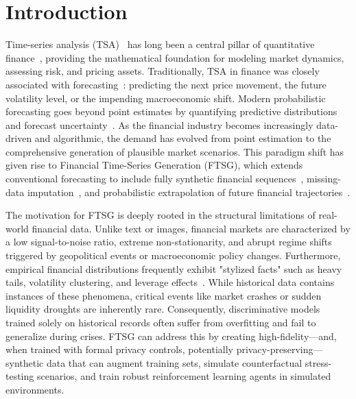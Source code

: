 \documentclass[11pt,a4paper]{article}
\begin{document}
\section{Introduction}
\label{sec:1}

Time-series analysis (TSA)~\citep{hamilton1994time,box2015time} has long been a central pillar of quantitative finance~\citep{campbell1997econometrics,tsay2010analysis}, providing the mathematical foundation for modeling market dynamics, assessing risk, and pricing assets. Traditionally, TSA in finance was closely associated with forecasting~\citep{hyndman2021forecasting}: predicting the next price movement, the future volatility level, or the impending macroeconomic shift. Modern probabilistic forecasting goes beyond point estimates by quantifying predictive distributions and forecast uncertainty~\citep{gneiting2014probabilistic}. As the financial industry becomes increasingly data-driven and algorithmic, the demand has evolved from point estimation to the comprehensive generation of plausible market scenarios. This paradigm shift has given rise to Financial Time-Series Generation (FTSG), which extends conventional forecasting to include fully synthetic financial sequences~\citep{Time-GAN,wiese2020,naritomi2020data}, missing-data imputation~\citep{yoon2018gain,tashiro2021csdi,wang2024cwgain}, and probabilistic extrapolation of future financial trajectories~\citep{rasul2021timegrad}.

The motivation for FTSG is deeply rooted in the structural limitations of real-world financial data. Unlike text or images, financial markets are characterized by a low signal-to-noise ratio, extreme non-stationarity, and abrupt regime shifts triggered by geopolitical events or macroeconomic policy changes. Furthermore, empirical financial distributions frequently exhibit "stylized facts" such as heavy tails, volatility clustering, and leverage effects~\citep{cont2001empirical}. While historical data contains instances of these phenomena, critical events like market crashes or sudden liquidity droughts are inherently rare. Consequently, discriminative models trained solely on historical records often suffer from overfitting and fail to generalize during crises. FTSG can address this by creating high-fidelity—and, when trained with formal privacy controls, potentially privacy-preserving—synthetic data that can augment training sets, simulate counterfactual stress-testing scenarios, and train robust reinforcement learning agents in simulated environments.
\end{document}
